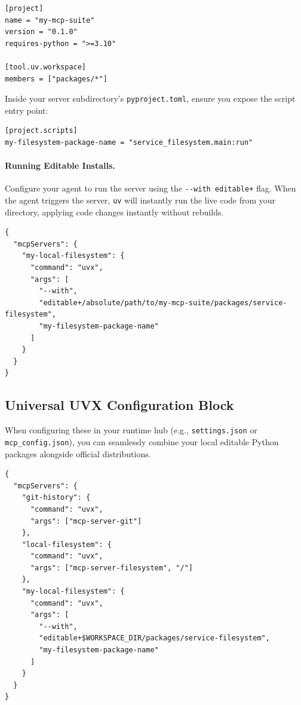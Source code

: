 \begin{lstlisting}[style=toml]
[project]
name = "my-mcp-suite"
version = "0.1.0"
requires-python = ">=3.10"

[tool.uv.workspace]
members = ["packages/*"]
\end{lstlisting}

Inside your server subdirectory's \lstinline[style=inline]|pyproject.toml|, ensure you expose the script entry point:

\begin{lstlisting}[style=toml]
[project.scripts]
my-filesystem-package-name = "service_filesystem.main:run"
\end{lstlisting}

\paragraph{Running Editable Installs.}
Configure your agent to run the server using the \lstinline[style=inline]|--with editable+| flag. When the agent triggers the server, \lstinline[style=inline]|uv| will instantly run the live code from your directory, applying code changes instantly without rebuilds.

\begin{lstlisting}[style=json]
{
  "mcpServers": {
    "my-local-filesystem": {
      "command": "uvx",
      "args": [
        "--with",
        "editable+/absolute/path/to/my-mcp-suite/packages/service-filesystem",
        "my-filesystem-package-name"
      ]
    }
  }
}
\end{lstlisting}

\subsection{Universal UVX Configuration Block}
When configuring these in your runtime hub (e.g., \lstinline[style=inline]|settings.json| or \lstinline[style=inline]|mcp_config.json|), you can seamlessly combine your local editable Python packages alongside official distributions.

\begin{lstlisting}[style=json]
{
  "mcpServers": {
    "git-history": {
      "command": "uvx",
      "args": ["mcp-server-git"]
    },
    "local-filesystem": {
      "command": "uvx",
      "args": ["mcp-server-filesystem", "/"]
    },
    "my-local-filesystem": {
      "command": "uvx",
      "args": [
        "--with",
        "editable+$WORKSPACE_DIR/packages/service-filesystem",
        "my-filesystem-package-name"
      ]
    }
  }
}
\end{lstlisting}
